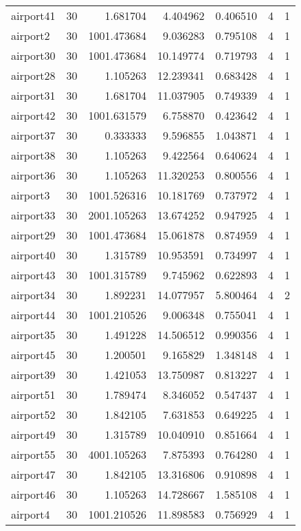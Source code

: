 \begin{longtable}{|l|r|r|r|r|r|r|}
airport41 & 30 & 1.681704 & 4.404962 & 0.406510 & 4 & 1 \\
airport2 & 30 & 1001.473684 & 9.036283 & 0.795108 & 4 & 1 \\
airport30 & 30 & 1001.473684 & 10.149774 & 0.719793 & 4 & 1 \\
airport28 & 30 & 1.105263 & 12.239341 & 0.683428 & 4 & 1 \\
airport31 & 30 & 1.681704 & 11.037905 & 0.749339 & 4 & 1 \\
airport42 & 30 & 1001.631579 & 6.758870 & 0.423642 & 4 & 1 \\
airport37 & 30 & 0.333333 & 9.596855 & 1.043871 & 4 & 1 \\
airport38 & 30 & 1.105263 & 9.422564 & 0.640624 & 4 & 1 \\
airport36 & 30 & 1.105263 & 11.320253 & 0.800556 & 4 & 1 \\
airport3 & 30 & 1001.526316 & 10.181769 & 0.737972 & 4 & 1 \\
airport33 & 30 & 2001.105263 & 13.674252 & 0.947925 & 4 & 1 \\
airport29 & 30 & 1001.473684 & 15.061878 & 0.874959 & 4 & 1 \\
airport40 & 30 & 1.315789 & 10.953591 & 0.734997 & 4 & 1 \\
airport43 & 30 & 1001.315789 & 9.745962 & 0.622893 & 4 & 1 \\
airport34 & 30 & 1.892231 & 14.077957 & 5.800464 & 4 & 2 \\
airport44 & 30 & 1001.210526 & 9.006348 & 0.755041 & 4 & 1 \\
airport35 & 30 & 1.491228 & 14.506512 & 0.990356 & 4 & 1 \\
airport45 & 30 & 1.200501 & 9.165829 & 1.348148 & 4 & 1 \\
airport39 & 30 & 1.421053 & 13.750987 & 0.813227 & 4 & 1 \\
airport51 & 30 & 1.789474 & 8.346052 & 0.547437 & 4 & 1 \\
airport52 & 30 & 1.842105 & 7.631853 & 0.649225 & 4 & 1 \\
airport49 & 30 & 1.315789 & 10.040910 & 0.851664 & 4 & 1 \\
airport55 & 30 & 4001.105263 & 7.875393 & 0.764280 & 4 & 1 \\
airport47 & 30 & 1.842105 & 13.316806 & 0.910898 & 4 & 1 \\
airport46 & 30 & 1.105263 & 14.728667 & 1.585108 & 4 & 1 \\
airport4 & 30 & 1001.210526 & 11.898583 & 0.756929 & 4 & 1 \\

\end{longtable}
